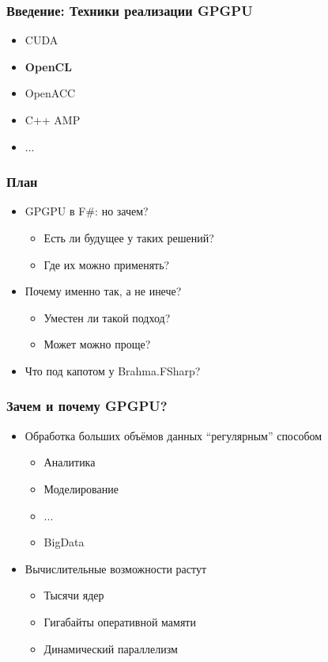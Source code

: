 \documentclass[xcolor=table]{beamer}
\begin{document}
\begin{frame}[fragile]
  \transwipe[direction=90]
  \frametitle{Введение: Техники реализации GPGPU}
    \begin{itemize}
        \item CUDA
        \item \textbf{OpenCL}
        \item OpenACC
        \item C++ AMP
        \item ...
    \end{itemize}        
\end{frame}

\begin{frame}[fragile]
  \transwipe[direction=90]
  \frametitle{План}
  \begin{itemize}
  \item GPGPU в F\#: но зачем?
    \begin{itemize}
        \item Есть ли будущее у таких решений?
        \item Где их можно применять?
    \end{itemize}
  \item Почему именно так, а не инече?
      \begin{itemize}
        \item Уместен ли такой подход?
        \item Может можно проще?
      \end{itemize}
   \item Что под капотом у Brahma.FSharp?
  \end{itemize}
\end{frame}

\begin{frame}[fragile]
  \transwipe[direction=90]
  \frametitle{Зачем и почему GPGPU?}
  \begin{itemize}
  \item Обработка больших объёмов данных ``регулярным'' способом
    \begin{itemize}
        \item Аналитика
        \item Моделирование
        \item ...
        \item BigData
    \end{itemize}
  \item Вычислительные возможности растут
    \begin{itemize}
        \item Тысячи ядер
        \item Гигабайты оперативной мамяти
        \item Динамический параллелизм
    \end{itemize}
    \end{itemize}
\end{frame}
\end{document}
